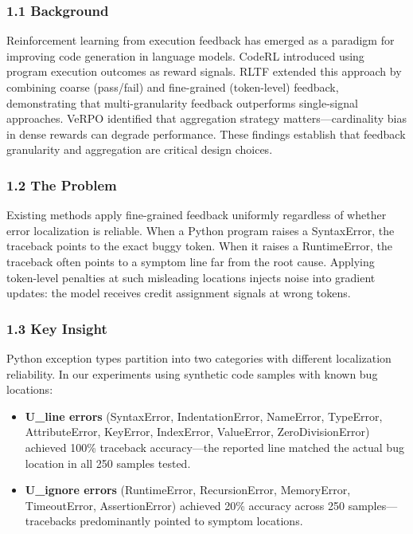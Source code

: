 
\subsubsection{1.1 Background}

Reinforcement learning from execution feedback has emerged as a paradigm for improving code generation in language models. CodeRL introduced using program execution outcomes as reward signals. RLTF extended this approach by combining coarse (pass/fail) and fine-grained (token-level) feedback, demonstrating that multi-granularity feedback outperforms single-signal approaches. VeRPO identified that aggregation strategy matters---cardinality bias in dense rewards can degrade performance. These findings establish that feedback granularity and aggregation are critical design choices.

\subsubsection{1.2 The Problem}

Existing methods apply fine-grained feedback uniformly regardless of whether error localization is reliable. When a Python program raises a SyntaxError, the traceback points to the exact buggy token. When it raises a RuntimeError, the traceback often points to a symptom line far from the root cause. Applying token-level penalties at such misleading locations injects noise into gradient updates: the model receives credit assignment signals at wrong tokens.

\subsubsection{1.3 Key Insight}

Python exception types partition into two categories with different localization reliability. In our experiments using synthetic code samples with known bug locations:

\begin{itemize}
\item \textbf{U\_line errors} (SyntaxError, IndentationError, NameError, TypeError, AttributeError, KeyError, IndexError, ValueError, ZeroDivisionError) achieved 100\% traceback accuracy---the reported line matched the actual bug location in all 250 samples tested.
\item \textbf{U\_ignore errors} (RuntimeError, RecursionError, MemoryError, TimeoutError, AssertionError) achieved 20\% accuracy across 250 samples---tracebacks predominantly pointed to symptom locations.
\end{itemize}

